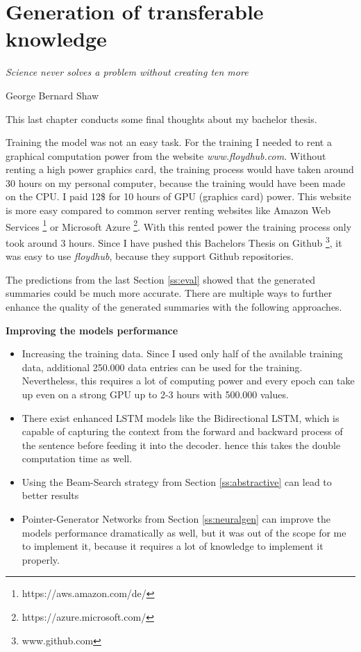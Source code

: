\chapter{Generation of transferable knowledge}\label{ch:knowledge}

\epigraph{\textit{Science never solves a problem without creating ten more}}{George Bernard Shaw}

This last chapter conducts some final thoughts about my bachelor thesis.

Training the model was not an easy task. For the training I needed to rent a graphical computation power from the website \textit{www.floydhub.com}. Without renting a high power graphics card, the training process would have taken around 30 hours on my personal computer, because the training would have been made on the CPU. I paid 12\$ for 10 hours of GPU (graphics card) power. This website is more easy compared to common server renting websites like Amazon Web Services \footnote{https://aws.amazon.com/de/} or Microsoft Azure \footnote{https://azure.microsoft.com/}. With this rented power the training process only took around 3 hours. Since I have pushed this Bachelors Thesis on Github \footnote{www.github.com}, it was easy to use \textit{floydhub}, because they support Github repositories.

The predictions from the last Section \ref{ss:eval} showed that the generated summaries could be much more accurate. There are multiple ways to further enhance the quality of the generated summaries with the following approaches. 

\textbf{Improving the models performance} 

\begin{itemize}
	\item Increasing the training data. Since I used only half of the available training data, additional 250.000 data entries can be used for the training. Nevertheless, this requires a lot of computing power and every epoch can take up even on a strong GPU up to 2-3 hours with 500.000 values.
	\item There exist enhanced LSTM models like the Bidirectional LSTM, which is capable of capturing the context from the forward and backward process of the sentence before feeding it into the decoder. hence this takes the double computation time as well.
	\item Using the Beam-Search strategy from Section \ref{ss:abstractive} can lead to better results
	\item Pointer-Generator Networks from Section \ref{ss:neuralgen} can improve the models performance dramatically as well, but it was out of the scope for me to implement it, because it requires a lot of knowledge to implement it properly.
\end{itemize}


